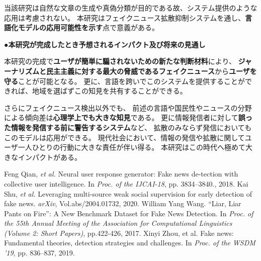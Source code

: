 {	当該研究は⾃然な文章の⽣成や真偽分類が⽬的である故、システム提供のような応⽤は考慮されない。
	本研究はフェイクニュース拡散抑制システムを通し、\textbf{⾔語化モデルの応⽤可能性を⽰す}点で意義がある。

	\noindent
	●\textbf{本研究が完成したとき予想されるインパクト及び将来の見通し}
	
	本研究の完成で\textbf{ユーザが簡単に騙されないための新たな判断材料}により、
	\textbf{ジャーナリズムと民主主義に対する最大の脅威であるフェイクニュース}\cite{zhou2019wsdm}から\textbf{ユーザを守る}ことが可能となる。
	更に、言語を跨いでこのシステムを提供することができれば、地域を選ばずこの知見を共有することができる。
	
	さらにフェイクニュース検出以外でも、
	前述の言語や国民性やニュースの分野による傾向差は\textbf{心理学上でも大きな知見}である。
	更に情報発信者に対して\textbf{誤った情報を発信する前に警告するシステム}など、
	拡散のみならず発信においてもこのモデルは応用ができる。
	現代社会において、情報の発信や拡散に関してユーザ一人ひとりの行動に大きな責任が伴い得る。
	本研究はこの時代へ極めて⼤きなインパクトがある。

	

	{\footnotesize
		\begin{thebibliography}{99}
			\setcounter{enumiv}{7}
			\vspace*{-2mm}
			\setlength{\parskip}{0cm}
			\setlength{\itemsep}{0cm}
			\begin{spacing}{0.7}
				 Feng Qian, \textit{et al.} Neural user response generator: Fake news de-tection with collective user intelligence. In \textit{Proc. of the IJCAI-18}, pp. 3834–3840., 2018.
				 Kai Shu, \textit{et al.} Leveraging multi-source weak social supervision for early detection of fake news. \textit{arXiv}, Vol.abs/2004.01732, 2020.
				William Yang Wang. ``Liar, Liar Pants on Fire'': A New Benchmark Dataset for Fake News Detection. In \textit{Proc. of the 55th Annual Meeting of the Association for Computational Linguistics (Volume 2: Short Papers)}, pp.422-426, 2017.
				Xinyi Zhou, et al. Fake news: Fundamental theories, detection strategies and challenges. In \textit{Proc. of the WSDM '19}, pp. 836–837, 2019.
			\end{spacing}
		\end{thebibliography}
	}
}

